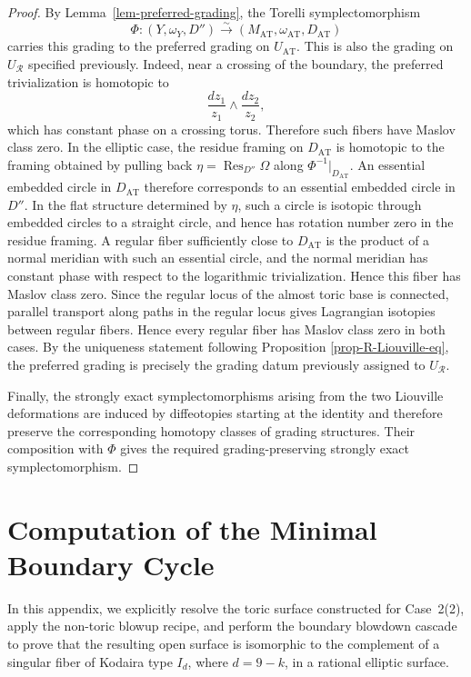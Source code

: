 \documentclass[11pt, reqno]{amsart}
\theoremstyle{definition}
\begin{document}
\begin{proof}
By Lemma~\ref{lem-preferred-grading}, the Torelli symplectomorphism
\[
\Phi\colon(Y,\omega_Y,D'')
\xrightarrow{\sim}
(M_{\mathrm{AT}},\omega_{\mathrm{AT}},D_{\mathrm{AT}})
\]
carries this grading to the preferred grading on
$U_{\mathrm{AT}}$. This is also the grading on $U_{\mathcal R}$
specified previously. Indeed, near a crossing of the boundary, the
preferred trivialization is homotopic to
\[
\frac{dz_1}{z_1}\wedge\frac{dz_2}{z_2},
\]
which has constant phase on a crossing torus. Therefore such fibers have Maslov class zero. In the elliptic case, the residue framing on $D_{\mathrm{AT}}$
is homotopic to the framing obtained by pulling back
$\eta=\operatorname{Res}_{D''}\Omega$ along
$\Phi^{-1}|_{D_{\mathrm{AT}}}$.
An essential embedded circle in $D_{\mathrm{AT}}$ therefore corresponds
to an essential embedded circle in $D''$. In the flat structure
determined by $\eta$, such a circle is isotopic through embedded circles
to a straight circle, and hence has rotation number zero in the residue
framing. A regular fiber sufficiently close to $D_{\mathrm{AT}}$ is the
product of a normal meridian with such an essential circle, and the
normal meridian has constant phase with respect to the logarithmic
trivialization. Hence this fiber has Maslov class zero. Since the regular
locus of the almost toric base is connected, parallel transport along
paths in the regular locus gives Lagrangian isotopies between regular
fibers. Hence every regular fiber has Maslov class zero in both cases. By the uniqueness statement
following Proposition \ref{prop-R-Liouville-eq}, the preferred grading is precisely the
grading datum previously assigned to $U_{\mathcal R}$.

Finally, the strongly exact symplectomorphisms arising from the two
Liouville deformations are induced by diffeotopies starting at the
identity and therefore preserve the corresponding homotopy classes
of grading structures. Their composition with $\Phi$ gives the
required grading-preserving strongly exact symplectomorphism.


\end{proof}



\appendix
\section{Computation of the Minimal Boundary Cycle}

In this appendix, we explicitly resolve the toric surface constructed
for Case~2(2), apply the non-toric blowup recipe, and perform the
boundary blowdown cascade to prove that the resulting open surface is
isomorphic to the complement of a singular fiber of Kodaira type
$I_d$, where $d=9-k$, in a rational elliptic surface.
\end{document}
